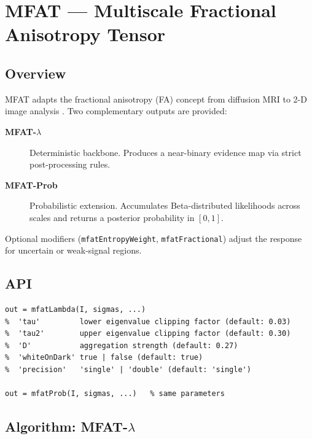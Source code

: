 \documentclass[a4paper,justified]{tufte-book}
\begin{document}
\newpage

\section{MFAT --- Multiscale Fractional Anisotropy Tensor}

\subsection{Overview}

MFAT adapts the fractional anisotropy (FA) concept from diffusion MRI to
2-D image analysis \cite{Alhasson2018}. Two complementary outputs are provided:

\begin{description}
  \item[\textbf{MFAT-$\lambda$}] Deterministic backbone. Produces a near-binary
        evidence map via strict post-processing rules.
  \item[\textbf{MFAT-Prob}] Probabilistic extension. Accumulates
        Beta-distributed likelihoods across scales and returns a posterior
        probability in $[0,1]$.
\end{description}

Optional modifiers (\texttt{mfatEntropyWeight}, \texttt{mfatFractional})
adjust the response for uncertain or weak-signal regions.

\subsection{API}

\begin{lstlisting}
out = mfatLambda(I, sigmas, ...)
%  'tau'         lower eigenvalue clipping factor (default: 0.03)
%  'tau2'        upper eigenvalue clipping factor (default: 0.30)
%  'D'           aggregation strength (default: 0.27)
%  'whiteOnDark' true | false (default: true)
%  'precision'   'single' | 'double' (default: 'single')

out = mfatProb(I, sigmas, ...)   % same parameters
\end{lstlisting}

\subsection{Algorithm: MFAT-$\lambda$}
\end{document}

